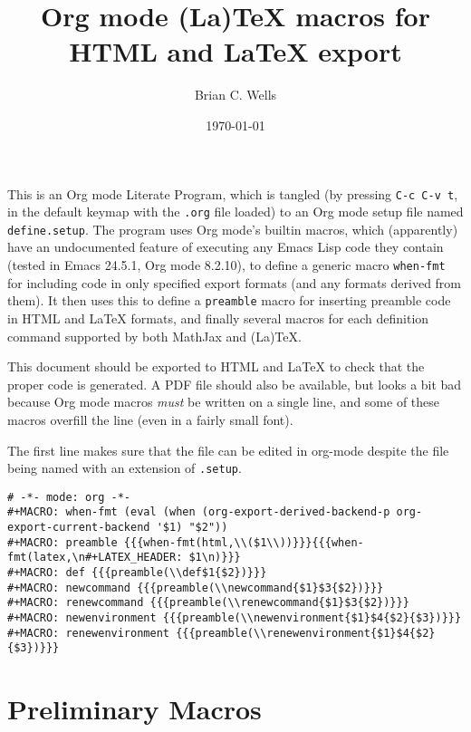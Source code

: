 \documentclass[11pt]{article}
\author{Brian C. Wells}
\date{\today}
\title{Org mode (La)\TeX{} macros for HTML and \LaTeX{} export}
\begin{document}
\maketitle
\tableofcontents

This is an Org mode Literate Program, which is tangled (by pressing
\verb~C-c C-v t~, in the default keymap with the \verb~.org~ file loaded) to an
Org mode setup file named \verb~define.setup~.  The program uses Org mode's
builtin macros, which (apparently) have an undocumented feature of
executing any Emacs Lisp code they contain (tested in Emacs 24.5.1,
Org mode 8.2.10), to define a generic macro \verb~when-fmt~ for including
code in only specified export formats (and any formats derived from
them).  It then uses this to define a \verb~preamble~ macro for inserting
preamble code in HTML and \LaTeX{} formats, and finally several macros
for each definition command supported by both MathJax and (La)\TeX{}.

This document should be exported to HTML and \LaTeX{} to check that the
proper code is generated.  A PDF file should also be available, but
looks a bit bad because Org mode macros \emph{must} be written on a single
line, and some of these macros overfill the line (even in a fairly
small font).

The first line makes sure that the file can be edited in org-mode
despite the file being named with an extension of \verb~.setup~.

\begin{verbatim}
# -*- mode: org -*-
#+MACRO: when-fmt (eval (when (org-export-derived-backend-p org-export-current-backend '$1) "$2"))
#+MACRO: preamble {{{when-fmt(html,\\($1\\))}}}{{{when-fmt(latex,\n#+LATEX_HEADER: $1\n)}}}
#+MACRO: def {{{preamble(\\def$1{$2})}}}
#+MACRO: newcommand {{{preamble(\\newcommand{$1}$3{$2})}}}
#+MACRO: renewcommand {{{preamble(\\renewcommand{$1}$3{$2})}}}
#+MACRO: newenvironment {{{preamble(\\newenvironment{$1}$4{$2}{$3})}}}
#+MACRO: renewenvironment {{{preamble(\\renewenvironment{$1}$4{$2}{$3})}}}
\end{verbatim}

\section{Preliminary Macros}
\label{sec-1}
\end{document}
